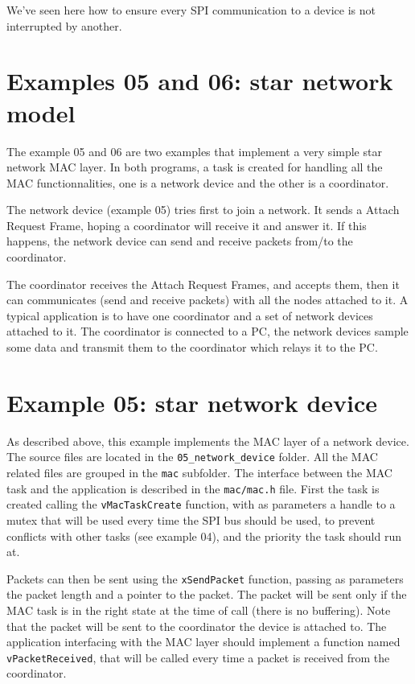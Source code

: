 \documentclass[11pt]{report}
\begin{document}
We've seen here how to ensure every SPI communication to a device is not interrupted by another.

\section{Examples 05 and 06: star network model}

The example 05 and 06 are two examples that implement a very simple star network MAC layer. In both programs, a task is created for handling all the MAC functionnalities, one is a network device and the other is a coordinator.

The network device (example 05) tries first to join a network. It sends a Attach Request Frame, hoping a coordinator will receive it and answer it. If this happens, the network device can send and receive packets from/to the coordinator.

The coordinator receives the Attach Request Frames, and accepts them, then it can communicates (send and receive packets) with all the nodes attached to it. A typical application is to have one coordinator and a set of network devices attached to it. The coordinator is connected to a PC, the network devices sample some data and transmit them to the coordinator which relays it to the PC.

\section{Example 05: star network device}
As described above, this example implements the MAC layer of a network device. The source files are located in the \verb$05_network_device$ folder. All the MAC related files are grouped in the \verb$mac$ subfolder. The interface between the MAC task and the application is described in the \verb$mac/mac.h$ file. First the task is created calling the \verb$vMacTaskCreate$ function, with as parameters a handle to a mutex that will be used every time the SPI bus should be used, to prevent conflicts with other tasks (see example 04), and the priority the task should run at.

Packets can then be sent using the \verb$xSendPacket$ function, passing as parameters the packet length and a pointer to the packet. The packet will be sent only if the MAC task is in the right state at the time of call (there is no buffering). Note that the packet will be sent to the coordinator the device is attached to. The application interfacing with the MAC layer should implement a function named \verb$vPacketReceived$, that will be called every time a packet is received from the coordinator.
\end{document}

